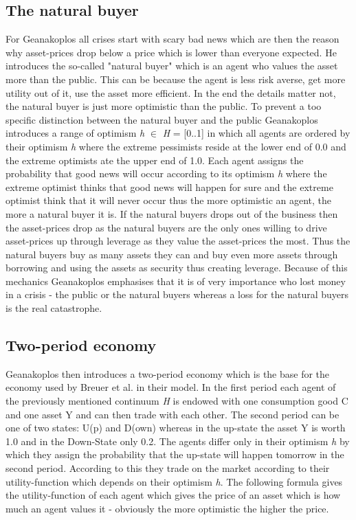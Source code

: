 \documentclass[../Bachelorarbeit.tex]{subfiles}
\begin{document}
\subsection{The natural buyer}
For Geanakoplos all crises start with scary bad news which are then the reason why asset-prices drop below a price which is lower than everyone expected. He introduces the so-called "natural buyer" which is an agent who values the asset more than the public. This can be because the agent is less risk averse, get more utility out of it, use the asset more efficient. In the end the details matter not, the natural buyer is just more optimistic than the public.
To prevent a too specific distinction between the natural buyer and the public Geanakoplos introduces a range of optimism \textit{h} $\in$ \textit{H} = [0..1] in which all agents are ordered by their optimism \textit{h} where the extreme pessimists reside at the lower end of 0.0 and the extreme optimists ate the upper end of 1.0. Each agent assigns the probability that good news will occur according to its optimism \textit{h} where the extreme optimist thinks that good news will happen for sure and the extreme optimist think that it will never occur thus the more optimistic an agent, the more a natural buyer it is. If the natural buyers drops out of the business then the asset-prices drop as the natural buyers are the only ones willing to drive asset-prices up through leverage as they value the asset-prices the most. Thus the natural buyers buy as many assets they can and buy even more assets through borrowing and using the assets as security thus creating leverage. Because of this mechanics Geanakoplos emphasises that it is of very importance who lost money in a crisis - the public or the natural buyers whereas a loss for the natural buyers is the real catastrophe.

\subsection{Two-period economy}
Geanakoplos then introduces a two-period economy which is the base for the economy used by Breuer et al. in their model. In the first period each agent of the previously mentioned continuum \textit{H} is endowed with one consumption good C and one asset Y and can then trade with each other. The second period can be one of two states: U(p) and D(own) whereas in the up-state the asset Y is worth 1.0 and in the Down-State only 0.2. The agents differ only in their optimism \textit{h} by which they assign the probability that the up-state will happen tomorrow in the second period. According to this they trade on the market according to their utility-function which depends on their optimism \textit{h}. The following formula gives the utility-function of each agent which gives the price of an asset which is how much an agent values it - obviously the more optimistic the higher the price.
\end{document}
